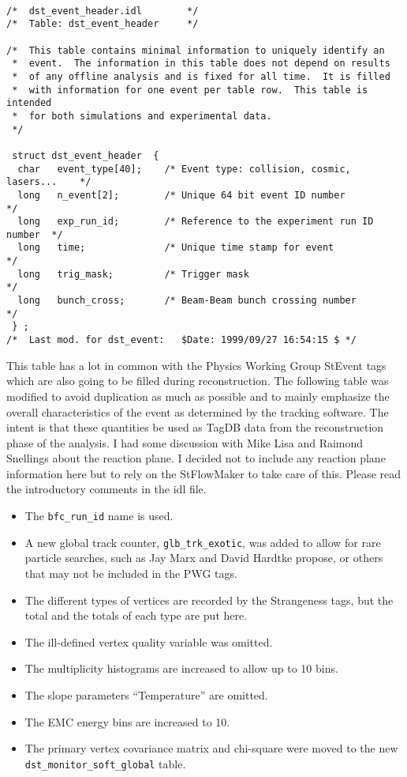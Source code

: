 \begin{verbatim}

/*  dst_event_header.idl        */
/*  Table: dst_event_header     */

/*  This table contains minimal information to uniquely identify an
 *  event.  The information in this table does not depend on results
 *  of any offline analysis and is fixed for all time.  It is filled
 *  with information for one event per table row.  This table is intended
 *  for both simulations and experimental data.
 */

 struct dst_event_header  {
  char   event_type[40];    /* Event type: collision, cosmic, lasers...    */
  long   n_event[2];        /* Unique 64 bit event ID number               */
  long   exp_run_id;        /* Reference to the experiment run ID number  */
  long   time;              /* Unique time stamp for event                 */
  long   trig_mask;         /* Trigger mask                                */
  long   bunch_cross;       /* Beam-Beam bunch crossing number             */
 } ;
/*  Last mod. for dst_event:   $Date: 1999/09/27 16:54:15 $ */

\end{verbatim}

\vspace{0.1in}
\vspace{0.05in}

This table has a lot in common with the Physics Working Group StEvent tags
which are also going to be filled during reconstruction.  The following
table was modified to avoid duplication as much as possible and to mainly
emphasize the overall characteristics of the event as determined by the
tracking software.  The intent is that these quantities be used as TagDB
data from the reconstruction phase of the analysis.  I had some discussion
with Mike Lisa and Raimond Snellings about the reaction plane.  I decided
not to include any reaction plane information here but to rely on the
StFlowMaker to take care of this.  Please read the
introductory comments in the idl file.

\begin{itemize}
\item
The {\tt bfc\_run\_id} name is used.
\item
A new global track counter, {\tt glb\_trk\_exotic}, was added to allow for
rare particle searches, such as Jay Marx and David Hardtke propose, or
others that may not be included in the PWG tags.  
\item
The different types of vertices are recorded by the Strangeness tags,
but the total and the totals of each type are put here.
\item 
The ill-defined vertex quality variable was omitted. 
\item
The multiplicity histograms are increased to allow up to 10 bins.
\item
The slope parameters ``Temperature'' are omitted.
\item
The EMC energy bins are increased to 10.
\item
The primary vertex covariance matrix and chi-square were moved to the new
{\tt dst\_monitor\_soft\_global} table.
\end{itemize}

